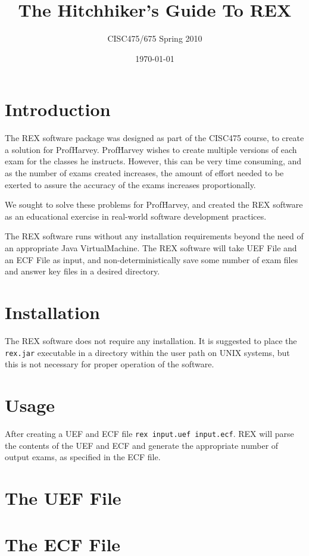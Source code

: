 \documentclass{article}
\author{CISC475/675 Spring 2010}
\title{The Hitchhiker's Guide To REX}
\date{\today}
\begin{document}
\maketitle
\tableofcontents
\newpage

\section{Introduction}
The REX software package was designed as part of the CISC475 course,
to create a solution for Prof\. Harvey. Prof\. Harvey wishes to create
multiple versions of each exam for the classes he instructs. However,
this can be very time consuming, and as the number of exams created
increases, the amount of effort needed to be exerted to assure the
accuracy of the exams increases proportionally.

We sought to solve these problems for Prof\. Harvey, and created the
REX software as an educational exercise in real-world software
development practices.

The REX software runs without any installation requirements beyond the
need of an appropriate Java VirtualMachine. The REX software will take
UEF File and an ECF File as input, and non-deterministically save
some number of exam files and answer key files in a desired directory.

\section{Installation}
The REX software does not require any installation. It is suggested to
place the \texttt{rex.jar} executable in a directory within the user
path on UNIX systems, but this is not necessary for proper operation
of the software.

\section{Usage}
After creating a UEF and ECF file \texttt{rex input.uef input.ecf}. 
REX will parse the contents of the UEF and ECF and generate the appropriate number of
output exams, as specified in the ECF file.

\section{The UEF File}

\section{The ECF File}
\end{document}
